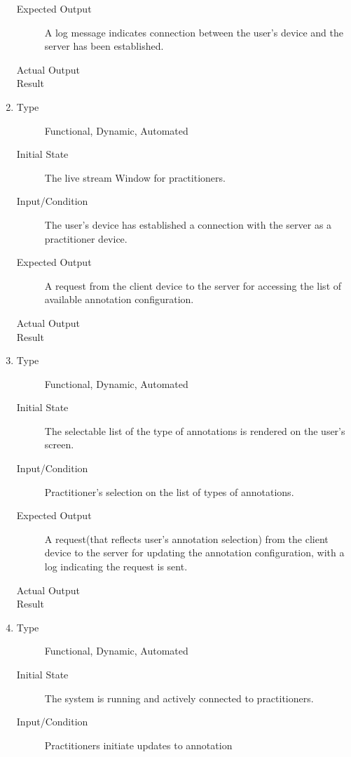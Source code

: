 \documentclass[12pt, titlepage]{article}
\begin{document}
\begin{enumerate}[FR-T1]
\begin{description}
    \item[Expected Output] A log message indicates connection between the user’s device
      and the server has been established.
    \item[Actual Output] 
    \item[Result] 
    \end{description}
  \item \label{FRT4}
    \begin{description}
    \item[Type] Functional, Dynamic, Automated
    \item[Initial State] The live stream Window for practitioners.
    \item[Input/Condition] The user’s device has established a connection with the
      server as a practitioner device.
    \item[Expected Output] A request from the client device to the server for accessing
      the list of available annotation configuration.
    \item[Actual Output] 
    \item[Result] 
    \end{description}
  \item \label{FRT5}
    \begin{description}
    \item[Type] Functional, Dynamic, Automated
    \item[Initial State] The selectable list of the type of annotations is
      rendered on the user's screen.
    \item[Input/Condition] Practitioner’s selection on the list of types of
      annotations.
    \item[Expected Output] A request(that reflects user’s annotation selection) from
      the client device to the server for updating the annotation configuration,
      with a log indicating the request is sent.
    \item[Actual Output] 
    \item[Result] 
    \end{description}
  \item \label{FRT6}
    \begin{description}
    \item[Type] Functional, Dynamic, Automated
    \item[Initial State] The system is running and actively connected to
      practitioners.
    \item[Input/Condition] Practitioners initiate updates to annotation

\end{description}
\end{enumerate}
\end{document}
